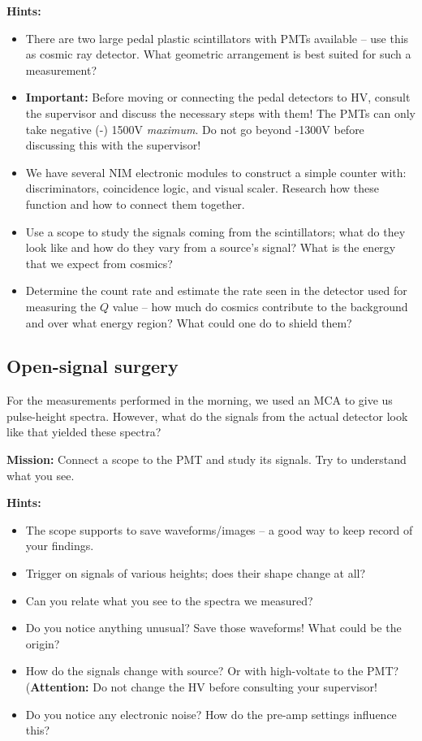 \documentclass[a4,11pt, notitlepage]{article}
\begin{document}
\noindent\textbf{Hints:}
\begin{itemize}
\item There are two large pedal plastic scintillators with PMTs
  available -- use this as cosmic ray detector. What geometric
  arrangement is best suited for such a measurement?
\item \textbf{Important:} Before moving or connecting the pedal detectors to HV, consult
  the supervisor and discuss the necessary steps with them! The PMTs
  can only take negative (-) 1500V \emph{maximum}. Do not go beyond
  -1300V before discussing this with the supervisor!
\item We have several NIM electronic modules to construct a simple
  counter with: discriminators, coincidence logic, and visual
  scaler. Research how these function and how to connect them together.
\item Use a scope to study the signals coming from the scintillators;
  what do they look like and how do they vary from a source's signal?
  What is the energy that we expect from cosmics?
\item Determine the count rate and estimate the rate seen in the
  detector used for measuring the $Q$ value -- how much do cosmics
  contribute to the background and over what energy region? What could
  one do to shield them?
\end{itemize}

\subsection{Open-signal surgery}
\label{sec:}
For the measurements performed in the morning, we used an MCA to
give us pulse-height spectra. However, what do the signals from the
actual detector look like that yielded these spectra?

\noindent\textbf{Mission:} Connect a scope to the PMT and study its
signals. Try to understand what you see.

\noindent\textbf{Hints:}
\begin{itemize}
\item The scope supports to save waveforms/images -- a good way to
  keep record of your findings.
\item Trigger on signals of various heights; does their shape change
  at all?
\item Can you relate what you see to
the spectra we measured?
\item Do you notice anything unusual? Save those waveforms! What could
  be the origin?
\item How do the signals change with source? Or with high-voltate to the
  PMT? (\textbf{Attention:} Do not change the HV before consulting
  your supervisor!
\item Do you notice any electronic noise? How do the pre-amp settings
  influence this?
\end{itemize}
\end{document}
